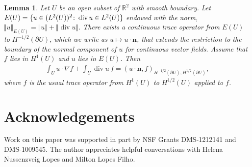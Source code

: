 \documentclass[reqno,openright,11pt,twoside]{amsart}
\newtheorem{lemma}[theorem]{Lemma}
\theoremstyle{definition}
\numberwithin{equation}{section}
\DeclarePairedDelimiter{\set}{\{}{\}}
\begin{document}
\begin{lemma}\label{L:TemamIBP}
	Let $U$ be an open subset of ${\ensuremath{{\ensuremath{\mathbb{{R}}}}}}^2$ with smooth boundary.
	Let $E(U) = \set{u \in (L^2(U))^2 \colon \operatorname{div} u \in L^2(U)}$ endowed with the norm,
	${\ensuremath{\Vert {u} \Vert}}_{E(U)} = {\ensuremath{\Vert {u} \Vert}} + {\ensuremath{\Vert {\operatorname{div} u} \Vert}}$.
	There exists a continuous trace operator from $E(U)$ to $H^{-1/2}({\ensuremath{\partial}} U)$, which we write
	as $u \mapsto u \cdot {\bm{n}}$, that extends the restriction to the boundary of the normal
	component of $u$ for continuous vector fields.
	Assume that $f$ lies in $H^1(U)$ and $u$ lies in $E(U)$.
	Then
	\begin{align*}
		\int_U u \cdot {\ensuremath{\nabla}} f + \int_U \operatorname{div} u \, f
			= (u \cdot {\bm{n}}, f)_{H^{-1/2}({\ensuremath{\partial}} U), H^{1/2}({\ensuremath{\partial}} U)},
	\end{align*}
	where $f$ is the usual trace operator from $H^1(U)$ to $H^{1/2}(U)$ applied to $f$.
\end{lemma}

\section*{Acknowledgements}

Work on this paper was supported in part by NSF Grants DMS-1212141 and DMS-1009545. The author appreciates helpful conversations with Helena Nussenzveig Lopes and Milton Lopes Filho.
\end{document}
